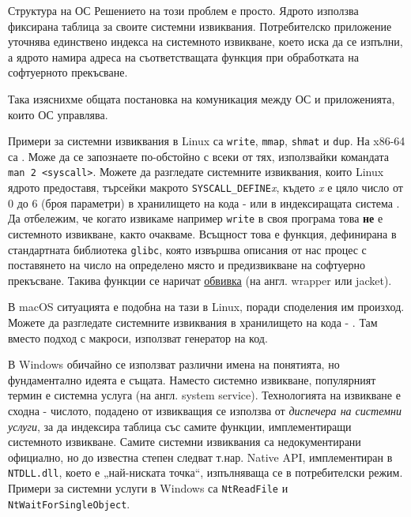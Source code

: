 \documentclass[14pt, aspectratio=169]{beamer}
\begin{document}
\begin{frame}[allowframebreaks]{Структура на ОС}
  Решението на този проблем е просто. Ядрото използва фиксирана таблица за
  своите системни извиквания. Потребителско приложение уточнява единствено
  индекса на системното извикване, което иска да се изпълни, а ядрото намира
  адреса на съответстващата функция при обработката на софтуерното
  прекъсване.

  Така изяснихме общата постановка на комуникация между ОС и приложенията,
  които ОС управлява.

  Примери за системни извиквания в Linux са \texttt{write}, \texttt{mmap},
  \texttt{shmat} и \texttt{dup}. На x86-64 са
  . Може да се
  запознаете по-обстойно с всеки от тях, използвайки командата \texttt{man 2
    <syscall>}. Можете да разгледате системните извиквания, които Linux
  ядрото предоставя, търсейки макрото \texttt{SYSCALL\_DEFINE}\emph{x}, където
  \emph{x} е цяло число от 0 до 6 (броя параметри) в хранилището на кода -
   или в
  индексиращата система
  . Да
  отбележим, че когато извикаме например \texttt{write} в своя програма това
  \textbf{не} е системното извикване, както очакваме. Всъщност това е
  функция, дефинирана в стандартната библиотека \texttt{glibc}, която
  извършва описания от нас процес с поставянето на число на определено място
  и предизвикване на софтуерно прекъсване. Такива функции се наричат
  \underline{обвивка} (на англ. wrapper или jacket).

  В macOS ситуацията е подобна на тази в Linux, поради споделения им
  произход. Можете да разгледате системните извиквания в хранилището на кода
  -
  .
  Там вместо подход с макроси, използват генератор на код.

  В Windows обичайно се използват различни имена на понятията, но
  фундаментално идеята е същата. Наместо системно извикване, популярният
  термин е системна услуга (на англ. system service). Технологията на
  извикване е сходна - числото, подадено от извикващия се използва от
  \emph{диспечера на системни услуги}, за да индексира таблица със самите
  функции, имплементиращи системното извикване. Самите системни извиквания
  са недокументирани официално, но до известна степен следват т.нар. Native
  API, имплементиран в \texttt{NTDLL.dll}, което е „най-ниската точка“,
  изпълняваща се в потребителски режим. Примери за системни услуги в Windows
  са \texttt{NtReadFile} и \texttt{NtWaitForSingleObject}.
\end{frame}
\end{document}
